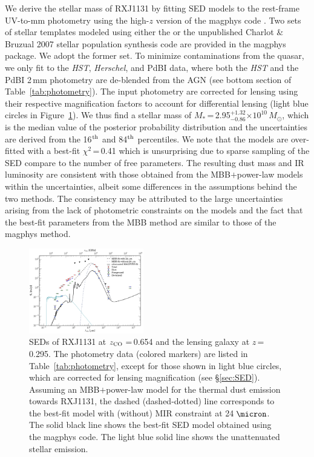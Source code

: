 \documentclass[]{emulateapj}
\newcommand{\Msun}{\mbox{$M_{\odot}$}\xspace}
\newcommand{\E}[1]{\mbox{$\times10^{#1}$}}
\newcommand{\petm}[2]{$^{+#1}_{-#2}$}
\newcommand{\eq}{\,=\,}
\newcommand{\Fig}[1]{Figure~\ref{fig:#1}}
\newcommand{\Tab}[1]{Table~\ref{tab:#1}}
\newcommand{\Sec}[1]{\S\ref{sec:#1}}
\newcommand{\ncode}[1]{{\sc #1}}
\begin{document}
We derive the stellar mass of RXJ1131 by
fitting SED models to the rest-frame UV-to-mm photometry
using the high-$z$ version of the {\sc magphys} code \citep{Magphys08a,Magphys15a}.
Two sets of stellar templates  modeled using either the \citet{BC03a} or the unpublished
Charlot \& Bruzual 2007 stellar population synthesis code
are provided in the {\sc magphys} package.
We adopt the former set.
To minimize contaminations from the quasar, we only fit to the {\it HST}, {\it Herschel}, and PdBI data,
where both the {\it HST} and the PdBI 2\,mm photometry are de-blended from the AGN
(see bottom section of \Tab{photometry}).
The input photometry are corrected for lensing using their respective magnification factors
to account for differential lensing (light blue circles in \Fig{SED}).
We thus find a stellar mass of $M_*$\eq2.95\petm{1.32}{0.86}\E{10}\,\Msun, which
is the median value of the posterior probability distribution and
the uncertainties are derived from the 16$^{\rm th}$ and 84$^{\rm th}$ percentiles.
We note that the models are over-fitted with a best-fit $\chi^2$\eq0.41
which is unsurprising due to sparse sampling of the SED
compare to the number of free parameters.
The resulting dust mass and IR luminosity are consistent with those obtained
from the MBB$+$power-law models within the uncertainties, albeit some differences
in the assumptions behind the two methods.
The consistency may be attributed to the large uncertainties arising from the lack of photometric constraints on the models and the fact that the best-fit parameters from the MBB method are similar to those of the \ncode{magphys} method.

\begin{figure}[!htbp]
\centering
\includegraphics[trim=5 5 5 5, clip, width=0.445\textwidth]{f10.pdf}
\caption{SEDs of RXJ1131 at
$z_{\rm CO}$\eq0.654 and the lensing galaxy at $z$\eq0.295.
The photometry data (colored markers) are listed in \Tab{photometry}, except for those
shown in light blue circles, which are corrected for lensing magnification (see \Sec{SED}).
Assuming an MBB$+$power-law model for the thermal dust emission towards RXJ1131,
the dashed (dashed-dotted) line corresponds to the best-fit model
with (without) MIR constraint at 24\,$\micron$.
The solid black line shows the best-fit SED model obtained using the \ncode{magphys} code.
The light blue solid line shows the unattenuated stellar emission.
\label{fig:SED}}
\end{figure}
\end{document}

